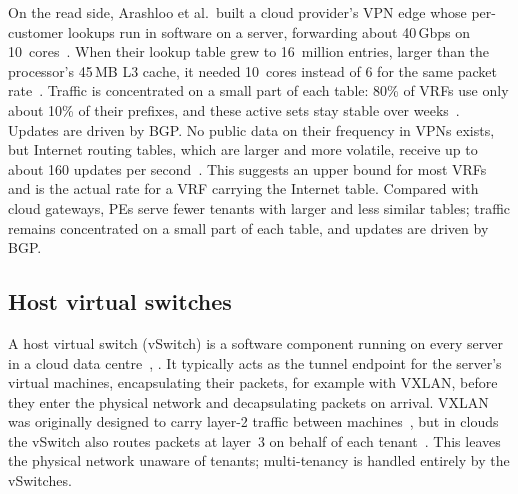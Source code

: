 \documentclass[11pt,a4paper,oneside]{report}
\begin{document}
On the read side, Arashloo et al.\ built a cloud provider's VPN edge whose
per-customer lookups run in software on a server, forwarding about 40\,Gbps on
10~cores~\cite{arashloo2018}. When their lookup table grew to 16~million
entries, larger than the processor's 45\,MB L3 cache, it needed 10~cores instead
of 6 for the same packet rate~\cite{arashloo2018}. Traffic is concentrated on a
small part of each table: 80\% of VRFs use only about 10\% of their prefixes, and
these active sets stay stable over weeks~\cite{kim2008relaying}. Updates are
driven by BGP. No public data on their frequency in VPNs exists, but Internet
routing tables, which are larger and more volatile, receive up to about 160
updates per second~\cite{li2014}. This suggests an upper bound for most VRFs and
is the actual rate for a VRF carrying the Internet table. Compared with cloud
gateways, PEs serve fewer tenants with larger and less similar tables; traffic
remains concentrated on a small part of each table, and updates are driven by
BGP.

\subsection{Host virtual switches}
\label{sec:vswitch}

A host virtual switch (vSwitch) is a software component running on every server
in a cloud data centre~\cite{firestone2017vfp}, \cite{dalton2018andromeda}. It
typically acts as the tunnel endpoint for the server's virtual machines,
encapsulating their packets, for example with VXLAN, before they enter the
physical network and decapsulating packets on arrival. VXLAN was originally
designed to carry layer-2 traffic between machines~\cite{rfc7348}, but in clouds
the vSwitch also routes packets at layer~3 on behalf of each
tenant~\cite{firestone2017vfp}. This leaves the physical network unaware of
tenants; multi-tenancy is handled entirely by the vSwitches.
\end{document}
